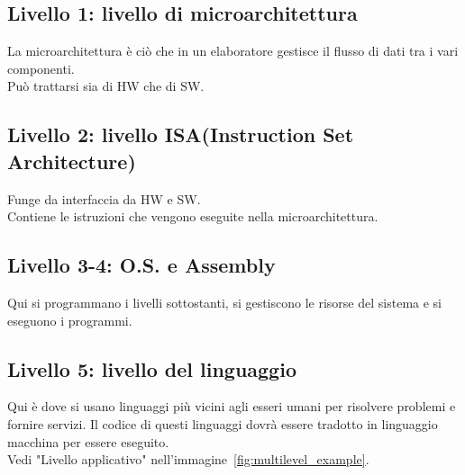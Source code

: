 \documentclass[12pt]{article}
\begin{document}
\subsection{Livello 1: livello di microarchitettura}
La microarchitettura è ciò che in un elaboratore gestisce il flusso di dati tra i vari componenti.\\
Può trattarsi sia di HW che di SW.
\subsection{Livello 2: livello ISA(Instruction Set Architecture)}
Funge da interfaccia da HW e SW.\\
Contiene le istruzioni che vengono eseguite nella microarchitettura.
\subsection{Livello 3-4: O.S. e Assembly}
Qui si programmano i livelli sottostanti, si gestiscono le risorse del sistema e si eseguono i programmi.
\subsection{Livello 5: livello del linguaggio}
Qui è dove si usano linguaggi più vicini agli esseri umani per risolvere problemi e fornire servizi. Il codice di questi linguaggi dovrà essere tradotto in linguaggio macchina per essere eseguito.\\
Vedi "Livello applicativo" nell'immagine~\ref{fig:multilevel_example}.
\end{document}
